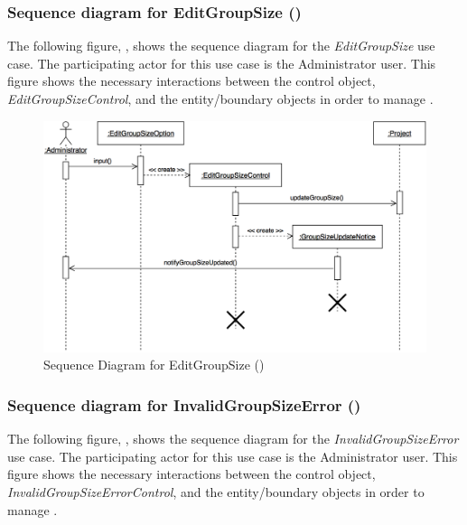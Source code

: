 \documentclass[12pt,letterpaper]{article}
\begin{document}
\subsubsection*{Sequence diagram for EditGroupSize ()}

The following figure, , shows the sequence diagram for the {\it EditGroupSize} use case. The participating actor for this use case is
the Administrator user. This figure shows the necessary interactions between the control object, {\it EditGroupSizeControl}, and the
entity/boundary objects in order to manage .

\begin{figure}[H]
	\centering{}
	\includegraphics[scale=0.27]{imgs/seq/edit-group-size.png}
	\caption[ - Sequence Diagram for EditGroupSize]{Sequence Diagram for EditGroupSize ()}
\end{figure}

\subsubsection*{Sequence diagram for InvalidGroupSizeError ()}

The following figure, , shows the sequence diagram for the {\it InvalidGroupSizeError} use case. The participating actor for this use case is
the Administrator user. This figure shows the necessary interactions between the control object, {\it InvalidGroupSizeErrorControl}, and the
entity/boundary objects in order to manage .
\end{document}
